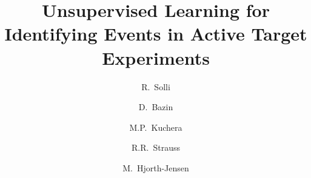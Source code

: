 \documentclass[review,number,sort&compress]{elsarticle}
\begin{document}
\begin{frontmatter}


\title{Unsupervised Learning  for Identifying  Events in Active Target  Experiments}


\author{R.~Solli}
\address{Expert Analytics AS, Tordenskiolds gate 6, 0160, Oslo, Norway}
\address{Department of Physics, University of Oslo, POB 1048 Oslo, N-0316 Oslo, Norway}

\author{D.~Bazin}
\address{Department of Physics and Astronomy and Facility for Rare Ion Beams and National Superconducting Cyclotron Facility, Michigan State University, East Lansing, MI 48824, USA}
\author{M.P.~Kuchera}
\address{Department of Physics, Davidson College, Davidson, North Carolina, USA}
\author{R.R.~Strauss}
\address{Department of Mathematics and Computer Science, Davidson College, Davidson, North Carolina, USA}

\author{M.~Hjorth-Jensen}
\address{Department of Physics and Astronomy and Facility for Rare Ion Beams and National Superconducting Cyclotron Facility, Michigan State University, East Lansing, MI 48824, USA}
\address{Department of Physics and Center for Computing in Science Education, University of Oslo, POB 1048 Oslo, N-0316 Oslo, Norway}



\end{frontmatter}
\end{document}
